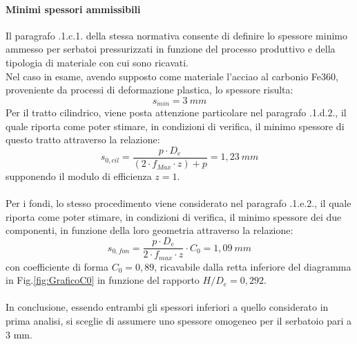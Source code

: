 \paragraph{Minimi spessori ammissibili}
Il paragrafo .1.c.1. della stessa normativa consente di definire lo spessore minimo ammesso per serbatoi pressurizzati in funzione del processo produttivo e della tipologia di materiale con cui sono ricavati.\\
Nel caso in esame, avendo supposto come materiale l'acciao al carbonio Fe360, proveniente da processi di deformazione plastica, lo spessore risulta:
\begin{equation}
    s_{min}=3\ mm
\end{equation}
Per il tratto cilindrico, viene posta attenzione particolare nel paragrafo .1.d.2., il quale riporta come poter stimare, in condizioni di verifica, il minimo spessore di questo tratto attraverso la relazione:
\begin{equation}
    s_{0,cil}=\frac{p\cdot D_e}{\left(2\cdot f_{Max}\cdot z\right)+p}=1,23\ mm
\end{equation}
supponendo il modulo di efficienza $z=1$. \\
\\
Per i fondi, lo stesso procedimento viene considerato nel paragrafo .1.e.2., il quale riporta come poter stimare, in condizioni di verifica, il minimo spessore dei due componenti, in funzione della loro geometria attraverso la relazione:
\begin{equation}
    s_{0,fon}=\frac{p\cdot D_e}{2\cdot f_{max}\cdot z}\cdot C_0=1,09\ mm
\end{equation}
con coefficiente di forma $C_0=0,89$, ricavabile dalla retta inferiore del diagramma in Fig.\ref{fig:GraficoC0} in funzione del rapporto $H/D_e=0,292$. \\
\\
In conclusione, essendo entrambi gli spessori inferiori a quello considerato in prima analisi, si sceglie di assumere uno spessore omogeneo per il serbatoio pari a 3 mm.
\newpage
